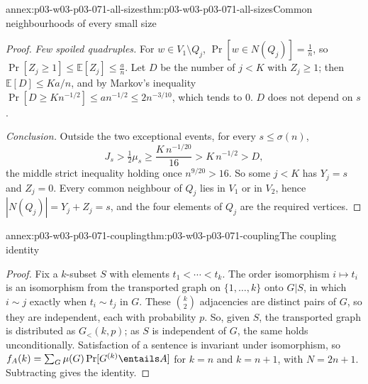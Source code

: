 \begin{annexitem}{annex:p03-w03-p03-071-all-sizes}{thm:p03-w03-p03-071-all-sizes}{Common neighbourhoods of every small size}
\begin{proof}
\emph{Few spoiled quadruples.}  For \(w\in V_1\setminus Q_j\),
\(\Pr[w\in N(Q_j)]=\frac1n\), so \(\Pr[Z_j\geq1]\leq\mathbb E[Z_j]\leq
\frac an\).  Let \(D\) be the number of \(j<K\) with \(Z_j\geq1\); then
\(\mathbb E[D]\leq Ka/n\), and by Markov's inequality
\(\Pr[D\geq Kn^{-1/2}]\leq an^{-1/2}\leq2n^{-3/10}\), which tends to \(0\).
\(D\) does not depend on \(s\).

\emph{Conclusion.}  Outside the two exceptional events, for every
\(s\leq\sigma(n)\),
\[
  J_s>\tfrac12\mu_s\geq\frac{K\,n^{-1/20}}{16}>K\,n^{-1/2}>D,
\]
the middle strict inequality holding once \(n^{9/20}>16\).  So some
\(j<K\) has \(Y_j=s\) and \(Z_j=0\).  Every common neighbour of \(Q_j\) lies
in \(V_1\) or in \(V_2\), hence \(|N(Q_j)|=Y_j+Z_j=s\), and the
four elements of \(Q_j\) are the required vertices.
\end{proof}
\end{annexitem}

\begin{annexitem}{annex:p03-w03-p03-071-coupling}{thm:p03-w03-p03-071-coupling}{The coupling identity}
\begin{proof}
Fix a \(k\)-subset \(S\) with elements \(t_1<\cdots<t_k\).  The order
isomorphism \(i\mapsto t_i\) is an isomorphism from the transported graph
on \(\{1,\ldots,k\}\) onto \(G|S\), in which \(i\sim j\) exactly when
\(t_i\sim t_j\) in \(G\).  These \(\binom k2\) adjacencies are distinct pairs
of \(G\), so they are independent, each with probability \(p\).  So, given
\(S\), the transported graph is distributed as \(G_<(k,p)\); as \(S\) is
independent of \(G\), the same holds unconditionally.  Satisfaction of a
sentence is invariant under isomorphism, so
\(f_A(k)=\sum_G\mu(G)\Pr[G^{(k)}\entails A]\) for \(k=n\) and \(k=n+1\), with
\(N=2n+1\).  Subtracting gives the identity.
\end{proof}
\end{annexitem}

